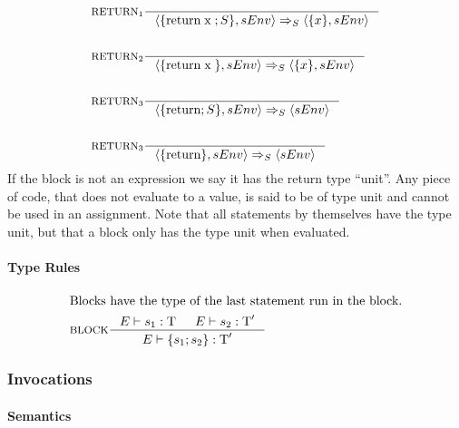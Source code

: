 \begin{align*}
&\inference[$\text{RETURN}_{1}$]{}
                   {\Braket{\{\Treturn \Tx;S\},sEnv} \Rightarrow_S \Braket{\{x\},sEnv}}
\\\\
&\inference[$\text{RETURN}_{2}$]{}
                   {\Braket{\{\Treturn \Tx\},sEnv} \Rightarrow_S \Braket{\{x\},sEnv}}
\\\\
&\inference[$\text{RETURN}_{3}$]{}
                   {\Braket{\{\Treturn;S\},sEnv} \Rightarrow_S \Braket{sEnv}}
\\\\
&\inference[$\text{RETURN}_{3}$]{}
                   {\Braket{\{\Treturn\},sEnv} \Rightarrow_S \Braket{sEnv}}
\end{align*}
If the block is not an expression we say it has the return type \enquote{unit}. Any piece of code, that does not evaluate to a value, is said to be of type unit and cannot be used in an assignment. Note that all statements by themselves have the type unit, but that a block only has the type unit when evaluated.

\paragraph{Type Rules}

\begin{align*}
\intertext{Blocks have the type of the last statement run in the block.}
&\inference[BLOCK]{\Tenv s_1: \Tt & \Tenv s_2: \Tt'}
                 {\Tenv \{s_1; s_2\} : \Tt'}
\end{align*}

\subsubsection{Invocations}

\paragraph{Semantics}

